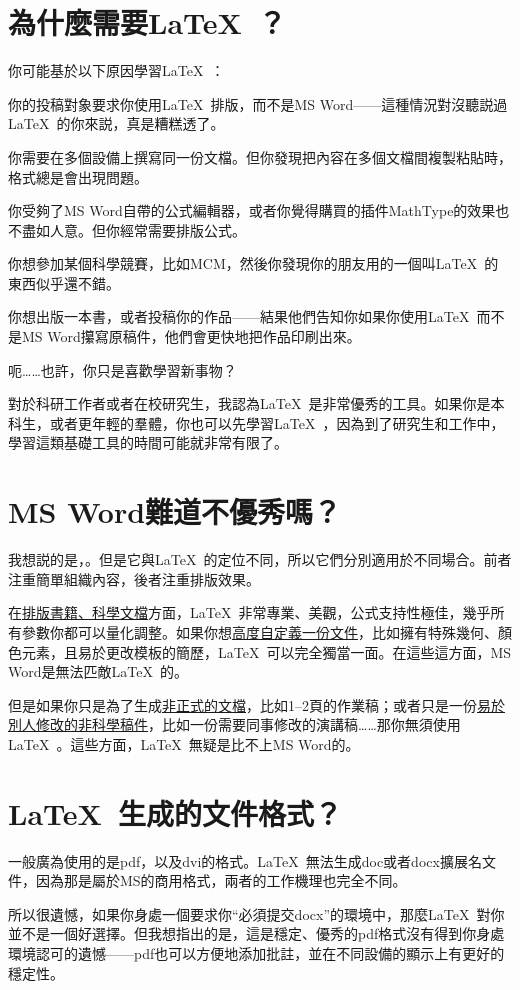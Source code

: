 \section{為什麼需要\LaTeX\ ？}
你可能基於以下原因學習\LaTeX\ ：
\begin{feae}
\item 你的投稿對象要求你使用\LaTeX\ 排版，而不是MS Word——這種情況對沒聽説過\LaTeX\ 的你來説，真是糟糕透了。
\item 你需要在多個設備上撰寫同一份文檔。但你發現把內容在多個文檔間複製粘貼時，格式總是會出現問題。
\item 你受夠了MS Word自帶的公式編輯器，或者你覺得購買的插件MathType的效果也不盡如人意。但你經常需要排版公式。
\item 你想參加某個科學競賽，比如MCM，然後你發現你的朋友用的一個叫\LaTeX\ 的東西似乎還不錯。
\item 你想出版一本書，或者投稿你的作品——結果他們告知你如果你使用\LaTeX\ 而不是MS Word攥寫原稿件，他們會更快地把作品印刷出來。
\item 呃……也許，你只是喜歡學習新事物？
\end{feae}

對於科研工作者或者在校研究生，我認為\LaTeX\ 是非常優秀的工具。如果你是本科生，或者更年輕的羣體，你也可以先學習\LaTeX\ ，因為到了研究生和工作中，學習這類基礎工具的時間可能就非常有限了。

\section{MS Word難道不優秀嗎？}
我想説的是，。但是它與\LaTeX\ 的定位不同，所以它們分別適用於不同場合。前者注重簡單組織內容，後者注重排版效果。

在\uline{排版書籍、科學文檔}方面，\LaTeX\ 非常專業、美觀，公式支持性極佳，幾乎所有參數你都可以量化調整。如果你想\uline{高度自定義一份文件}，比如擁有特殊幾何、顏色元素，且易於更改模板的簡歷，\LaTeX\ 可以完全獨當一面。在這些這方面，MS Word是無法匹敵\LaTeX\ 的。

但是如果你只是為了生成\uline{非正式的文檔}，比如1--2頁的作業稿；或者只是一份\uline{易於別人修改的非科學稿件}，比如一份需要同事修改的演講稿……那你無須使用\LaTeX\ 。這些方面，\LaTeX\ 無疑是比不上MS Word的。

\section{\LaTeX\ 生成的文件格式？}
一般廣為使用的是pdf，以及dvi的格式。\LaTeX\ 無法生成doc或者docx擴展名文件，因為那是屬於MS的商用格式，兩者的工作機理也完全不同。

所以很遺憾，如果你身處一個要求你“必須提交docx”的環境中，那麼\LaTeX\ 對你並不是一個好選擇。但我想指出的是，這是穩定、優秀的pdf格式沒有得到你身處環境認可的遺憾——pdf也可以方便地添加批註，並在不同設備的顯示上有更好的穩定性。